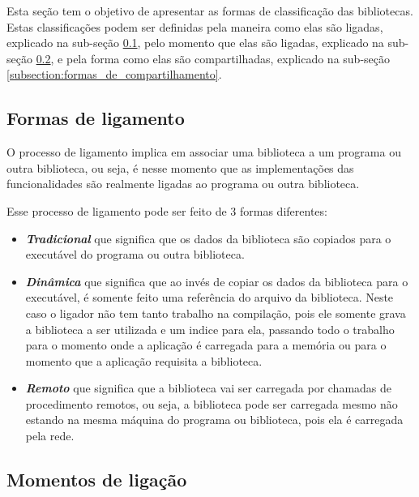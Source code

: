 Esta seção tem o objetivo de apresentar as formas de classificação das bibliotecas. Estas
classificações podem ser definidas pela maneira como elas são ligadas, explicado na sub-seção
\ref{subsection:formas_de_ligamento}, pelo momento que elas são ligadas, explicado na sub-seção
\ref{subsection:momentos_de_ligação}, e pela forma como elas são compartilhadas, explicado na
sub-seção \ref{subsection:formas_de_compartilhamento}.


\subsection{Formas de ligamento}
\label{subsection:formas_de_ligamento}

O processo de ligamento implica em associar uma biblioteca a um programa ou outra biblioteca, ou seja,
é nesse momento que as implementações das funcionalidades são realmente ligadas ao programa ou
outra biblioteca.

Esse processo de ligamento pode ser feito de 3 formas diferentes:

\begin{itemize}

 \item \emph{\textbf{Tradicional}} que significa que os dados da biblioteca são copiados para o executável do programa
 ou outra biblioteca.

 \item \emph{\textbf{Dinâmica}} que significa que ao invés de copiar os dados da biblioteca para o executável, é
 somente feito uma referência do arquivo da biblioteca. Neste caso o ligador não tem tanto
 trabalho na compilação, pois ele somente grava a biblioteca a ser utilizada e um indice para
 ela, passando todo o trabalho para o momento onde a aplicação é carregada para a memória ou para
 o momento que a aplicação requisita a biblioteca.

 \item \emph{\textbf{Remoto}} que significa que a biblioteca vai ser carregada por chamadas de procedimento remotos,
 ou seja, a biblioteca pode ser carregada mesmo não estando na mesma máquina do programa ou
 biblioteca, pois ela é carregada pela rede.

\end{itemize}


\subsection{Momentos de ligação}
\label{subsection:momentos_de_ligação}

